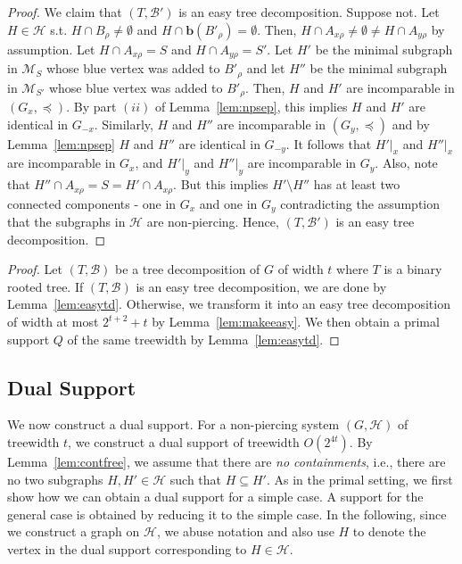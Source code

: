 \documentclass[12pt]{article}
\newcommand{\BB}{\mathcal{B}}
\newcommand{\B}{\mathbf{b}}
\newcommand{\HH}{\mathcal{H}}
\theoremstyle{case}
\begin{document}
\begin{proof}
We claim that $(T,\mathcal{B}')$ is an easy tree decomposition. 
Suppose not. Let $H\in\mathcal{H}$ s.t. $H\cap B_\rho\ne\emptyset$ and 
$H\cap \B(B'_\rho)=\emptyset$.
Then, $H\cap A_{x\rho}\neq\emptyset\neq H\cap A_{y\rho}$ by assumption.
Let $H\cap A_{x\rho}=S$ and $H\cap A_{y\rho}=S'$.
Let $H'$ be the minimal
subgraph in $\mathcal{M}_S$ whose blue vertex was added to $B'_\rho$
and let $H''$ be the minimal subgraph in $\mathcal{M}_{S'}$ whose
blue vertex was added to $B'_\rho$. 
Then, $H$ and $H'$ are incomparable in $(G_x,\preceq)$.
By part $(ii)$ of Lemma~\ref{lem:npsep}, this implies $H$ and $H'$ are identical in
$G_{-x}$. 
Similarly,
$H$ and $H''$ are incomparable in $(G_y,\preceq)$ and by 
Lemma~\ref{lem:npsep} $H$ and $H''$ are identical in
$G_{-y}$. 
It follows that $H'|_x$ and $H''|_x$ are incomparable in $G_x$, and $H'|_y$ and $H''|_y$ are incomparable in $G_y$.
Also, note that $H''\cap A_{x\rho}=S=H'\cap A_{x\rho}$.
But this implies $H'\setminus H''$ has at least two 
connected components - one in $G_x$ and one in $G_y$ contradicting
the assumption that the subgraphs in $\HH$ are non-piercing.
Hence, $(T,\BB')$ is an easy tree decomposition.
\end{proof}



\primalsupporttw*
\begin{proof}
Let $(T,\mathcal{B})$ be a tree decomposition of $G$ of width $t$ where $T$ is a binary rooted tree.
If $(T,\mathcal{B})$ is an easy tree decomposition, we are done by Lemma~\ref{lem:easytd}. Otherwise,
we transform it into an easy tree decomposition of width at most $2^{t+2} + t$
by Lemma~\ref{lem:makeeasy}. We then obtain a primal support $Q$ of the same treewidth by
Lemma~\ref{lem:easytd}.
\end{proof}


\subsection{Dual Support}
\label{sec:dual}
We now construct a dual support.
For a non-piercing system $(G,\HH)$ of treewidth $t$, we construct a dual support of treewidth $O(2^{4t})$.
By Lemma~\ref{lem:contfree}, we assume that there are \emph{no containments}, i.e., there are no two subgraphs $H, H'\in\mathcal{H}$ such that  $H\subseteq H'$. 
As in the primal setting, we first show how we can obtain a 
dual support for a simple case. A support for the general
case is obtained by reducing it to the simple case.
In the following, since we construct a graph on $\mathcal{H}$, we abuse notation
and also use $H$ to denote the vertex in the dual support corresponding to $H\in\mathcal{H}$.
\end{document}
